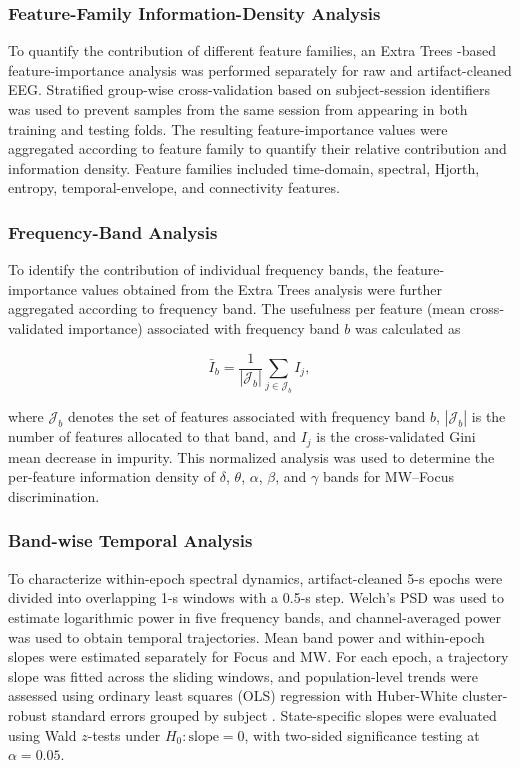 \documentclass[conference]{IEEEtran}
\begin{document}
\subsubsection{Feature-Family Information-Density Analysis}

To quantify the contribution of different feature families, an Extra Trees
\cite{geurts2006extremely}-based feature-importance analysis was performed
separately for raw and artifact-cleaned EEG. Stratified group-wise
cross-validation based on subject-session identifiers was used to prevent
samples from the same session from appearing in both training and testing
folds. The resulting feature-importance values were aggregated according to
feature family to quantify their relative contribution and information
density. Feature families included time-domain, spectral, Hjorth, entropy,
temporal-envelope, and connectivity features.

\subsubsection{Frequency-Band Analysis}

To identify the contribution of individual frequency bands, the feature-
importance values obtained from the Extra Trees analysis were further
aggregated according to frequency band. The usefulness per feature (mean cross-validated importance) associated with frequency band $b$ was calculated as

\begin{equation}
\bar{I}_b
=
\frac{1}{|\mathcal{J}_b|} \sum_{j\in\mathcal{J}_b} I_j,
\end{equation}

where $\mathcal{J}_b$ denotes the set of features associated with frequency
band $b$, $|\mathcal{J}_b|$ is the number of features allocated to that band, and $I_j$ is the cross-validated Gini mean decrease in impurity.
This normalized analysis was used to determine the per-feature information density of
$\delta$, $\theta$, $\alpha$, $\beta$, and $\gamma$ bands for MW--Focus
discrimination.

\subsubsection{Band-wise Temporal Analysis}

To characterize within-epoch spectral dynamics, artifact-cleaned 5-s epochs
were divided into overlapping 1-s windows with a 0.5-s step. Welch's PSD was
used to estimate logarithmic power in five frequency bands, and
channel-averaged power was used to obtain temporal trajectories. Mean band
power and within-epoch slopes were estimated separately for Focus and MW.
For each epoch, a trajectory slope was fitted across the sliding windows,
and population-level trends were assessed using ordinary least squares (OLS)
regression with Huber-White cluster-robust standard errors grouped by
subject \cite{white1980heteroskedasticity,rogers1994regression}.
State-specific slopes were evaluated using Wald $z$-tests under
$H_0:\text{slope}=0$, with two-sided significance testing at
$\alpha=0.05$.
\end{document}

